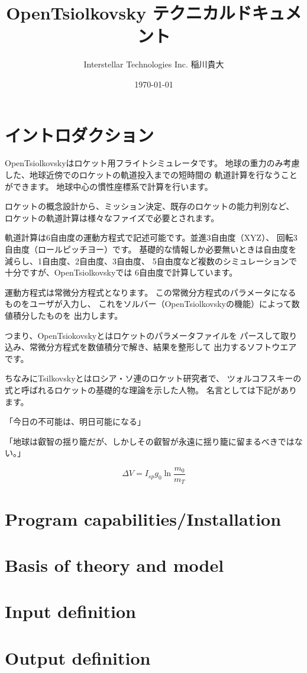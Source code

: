 \documentclass[12pt]{jsarticle}
\title{OpenTsiolkovsky テクニカルドキュメント}
\author{Interstellar Technologies Inc. 稲川貴大}
\date{\today}
\begin{document}
\maketitle
\begin{abstract}

\end{abstract}

\tableofcontents

\newpage
\section{イントロダクション}
OpenTsiolkovskyはロケット用フライトシミュレータです。
地球の重力のみ考慮した、地球近傍でのロケットの軌道投入までの短時間の
軌道計算を行なうことができます。
地球中心の慣性座標系で計算を行います。

ロケットの概念設計から、ミッション決定、既存のロケットの能力判別など、
ロケットの軌道計算は様々なファイズで必要とされます。

軌道計算は6自由度の運動方程式で記述可能です。並進3自由度（XYZ）、
回転3自由度（ロールピッチヨー）です。
基礎的な情報しか必要無いときは自由度を減らし、1自由度、2自由度、3自由度、
5自由度など複数のシミュレーションで十分ですが、OpenTsiolkovskyでは
6自由度で計算しています。

運動方程式は常微分方程式となります。
この常微分方程式のパラメータになるものをユーザが入力し、
これをソルバー（OpenTsiolkovskyの機能）によって数値積分したものを
出力します。

つまり、OpenTsiokovskyとはロケットのパラメータファイルを
パースして取り込み、常微分方程式を数値積分で解き、結果を整形して
出力するソフトウエアです。

ちなみにTsilkovskyとはロシア・ソ連のロケット研究者で、
ツォルコフスキーの式と呼ばれるロケットの基礎的な理論を示した人物。
名言としては下記があります。

「今日の不可能は、明日可能になる」

「地球は叡智の揺り籠だが、しかしその叡智が永遠に揺り籠に留まるべきではない。」

\begin{equation}
\Delta V = I_{sp} g_{0} \ln \frac{m_0}{m_T}
\end{equation}


\section{Program capabilities/Installation}

\section{Basis of theory and model}

\section{Input definition}

\section{Output definition}

\end{document}
